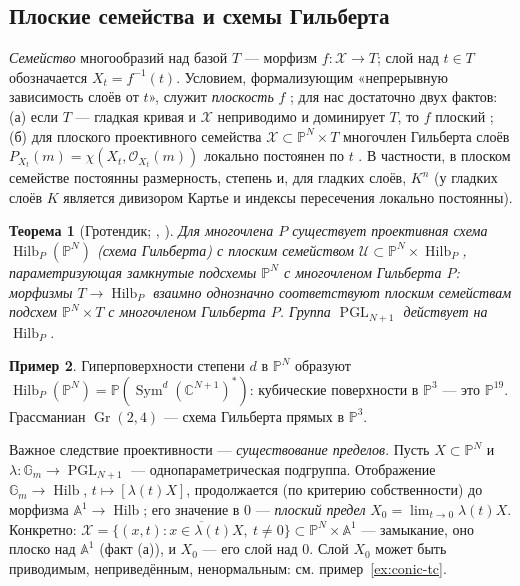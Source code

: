 \documentclass[11pt,a4paper]{article}
\theoremstyle{plain}
\newtheorem{theorem}{Теорема}[section]
\theoremstyle{definition}
\newtheorem{example}[theorem]{Пример}
\theoremstyle{remark}
\renewcommand{\C}{\mathbb{C}}
\newcommand{\PP}{\mathbb{P}}
\newcommand{\A}{\mathbb{A}}
\newcommand{\Gm}{\mathbb{G}_m}
\newcommand{\cO}{\mathcal{O}}
\newcommand{\cX}{\mathcal{X}}
\DeclareMathOperator{\PGL}{PGL}
\DeclareMathOperator{\Sym}{Sym}
\DeclareMathOperator{\Hilb}{Hilb}
\DeclareMathOperator{\Gr}{Gr}
\begin{document}
\subsection{Плоские семейства и схемы Гильберта}

\emph{Семейство} многообразий над базой $T$ --- морфизм $f\colon\cX\to T$; слой над $t\in T$
обозначается $X_t=f^{-1}(t)$. Условием, формализующим «непрерывную зависимость слоёв от $t$», служит
\emph{плоскость} $f$ \cite[III.9]{Ha}; для нас достаточно двух фактов: (а) если $T$ --- гладкая
кривая и $\cX$ неприводимо и доминирует $T$, то $f$ плоский \cite[III.9.7]{Ha}; (б) для плоского
проективного семейства $\cX\subset\PP^N\times T$ многочлен Гильберта слоёв
$P_{X_t}(m)=\chi(X_t,\cO_{X_t}(m))$ локально постоянен по $t$ \cite[III.9.9]{Ha}. В частности,
в плоском семействе постоянны размерность, степень и, для гладких слоёв, $K^n$ (у гладких слоёв
$K$ является дивизором Картье и индексы пересечения локально постоянны).

\begin{theorem}[{Гротендик; \cite[гл.~1]{HM}, \cite[I.1]{Kol96}}]\label{thm:Hilb}
Для многочлена $P$ существует проективная схема $\Hilb_P(\PP^N)$ \textup{(}\emph{схема Гильберта}\textup{)} с
плоским семейством $\mathcal U\subset\PP^N\times\Hilb_P$, параметризующая замкнутые подсхемы
$\PP^N$ с многочленом Гильберта $P$: морфизмы $T\to\Hilb_P$ взаимно однозначно соответствуют
плоским семействам подсхем $\PP^N\times T$ с многочленом Гильберта $P$. Группа $\PGL_{N+1}$
действует на $\Hilb_P$.
\end{theorem}

\begin{example}
Гиперповерхности степени $d$ в $\PP^N$ образуют $\Hilb_P(\PP^N)=\PP(\Sym^d(\C^{N+1})^*)$: кубические
поверхности в $\PP^3$ --- это $\PP^{19}$. Грассманиан $\Gr(2,4)$ --- схема Гильберта прямых в $\PP^3$.
\end{example}

Важное следствие проективности --- \emph{существование пределов}. Пусть $X\subset\PP^N$ и
$\lambda\colon\Gm\to\PGL_{N+1}$ --- однопараметрическая подгруппа. Отображение
$\Gm\to\Hilb$, $t\mapsto[\lambda(t)X]$, продолжается (по критерию собственности) до морфизма
$\A^1\to\Hilb$; его значение в $0$ --- \emph{плоский предел} $X_0=\lim_{t\to0}\lambda(t)X$.
Конкретно: $\cX=\overline{\{(x,t):x\in\lambda(t)X,\ t\ne0\}}\subset\PP^N\times\A^1$ --- замыкание,
оно плоско над $\A^1$ (факт (а)), и $X_0$ --- его слой над $0$. Слой $X_0$ может быть приводимым,
неприведённым, ненормальным: см. пример~\ref{ex:conic-tc}.
\end{document}
